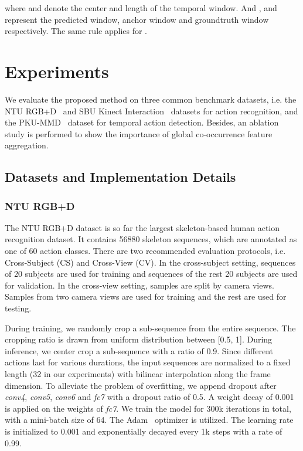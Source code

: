 \documentclass{article}
\begin{document}
where  and  denote the center and length of the temporal window. And ,  and  represent the predicted window, anchor window and groundtruth window respectively. The same rule applies for .

\section{Experiments}
We evaluate the proposed method on three common benchmark datasets, i.e. the NTU RGB+D~\cite{NTURGBD} and SBU Kinect Interaction~\cite{SBU} datasets for action recognition, and the PKU-MMD~\cite{PKUMMD} dataset for temporal action detection. Besides, an ablation study is performed to show the importance of global co-occurrence feature aggregation.

\subsection{Datasets and Implementation Details}
\subsubsection{NTU RGB+D}

The NTU RGB+D dataset is so far the largest skeleton-based human action recognition dataset. It contains 56880 skeleton sequences, which are annotated as one of 60 action classes. There are two recommended evaluation protocols, i.e. Cross-Subject (CS) and Cross-View (CV). In the cross-subject setting, sequences of 20 subjects are used for training and sequences of the rest 20 subjects are used for validation. In the cross-view setting, samples are split by camera views. Samples from two camera views are used for training and the rest are used for testing.

During training, we randomly crop a sub-sequence from the entire sequence. The cropping ratio is drawn from uniform distribution between [0.5, 1]. During inference, we center crop a sub-sequence with a ratio of 0.9. Since different actions last for various durations, the input sequences are normalized to a fixed length (32 in our experiments) with bilinear interpolation along the frame dimension. To alleviate the problem of overfitting, we append dropout after \emph{conv4}, \emph{conv5}, \emph{conv6} and \emph{fc7} with a dropout ratio of 0.5. A weight decay of 0.001 is applied on the weights of \emph{fc7}. We train the model for 300k iterations in total, with a mini-batch size of 64. The Adam~\cite{kingma2015adam} optimizer is utilized. The learning rate is initialized to 0.001 and exponentially decayed every 1k steps with a rate of 0.99.
\end{document}
